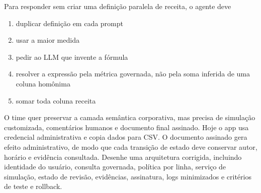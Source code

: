 \documentclass[12pt,a4paper]{article}
\begin{document}
\FonteDidatica

\Comando Para responder sem criar uma definição paralela de receita, o agente deve

\begin{enumerate}[label=\Alph*)]
  \item duplicar definição em cada prompt
  \item usar a maior medida
  \item pedir ao LLM que invente a fórmula
  \item resolver a expressão pela métrica governada, não pela soma inferida de uma coluna homônima
  \item somar toda coluna receita
\end{enumerate}

\TextoBase
O time quer preservar a camada semântica corporativa, mas precisa de simulação customizada, comentários humanos e documento final assinado. Hoje o app usa credencial administrativa e copia dados para CSV.
O documento assinado gera efeito administrativo, de modo que cada transição de estado deve conservar autor, horário e evidência consultada.
\FonteDidatica
\Comando Desenhe uma arquitetura corrigida, incluindo identidade do usuário, consulta governada, política por linha, serviço de simulação, estado de revisão, evidências, assinatura, logs minimizados e critérios de teste e rollback.
\EspacoDiscursiva
\end{document}
